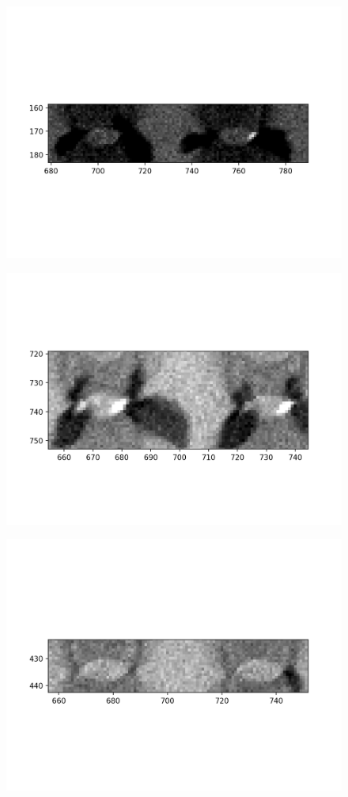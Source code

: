 \documentclass[10pt,a4paper]{article}
\begin{document}
	\begin{figure}[h]
		\includegraphics{data/image_stamps/e3}
	\end{figure}
	\begin{figure}[h]
		\includegraphics{data/image_stamps/e4}
	\end{figure}
	\begin{figure}[h]
		\includegraphics{data/image_stamps/e5}
	\end{figure}
\end{document}

